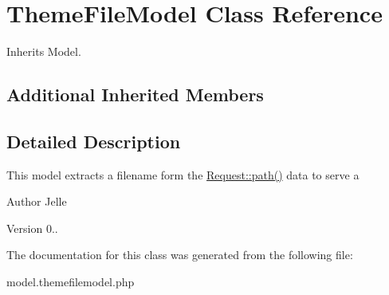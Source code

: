 \hypertarget{class_theme_file_model}{\section{Theme\-File\-Model Class Reference}
\label{class_theme_file_model}
}


Inherits Model.

\subsection*{Additional Inherited Members}


\subsection{Detailed Description}
This model extracts a filename form the \hyperlink{class_request_ae1725b521b1833602f3f554566142c51}{Request\-::path()} data to serve a

\begin{DoxyAuthor}{Author}
Jelle 
\end{DoxyAuthor}
\begin{DoxyVersion}{Version}
0.. 
\end{DoxyVersion}


The documentation for this class was generated from the following file\-:\begin{DoxyCompactItemize}
\item 
model.\-themefilemodel.\-php\end{DoxyCompactItemize}
